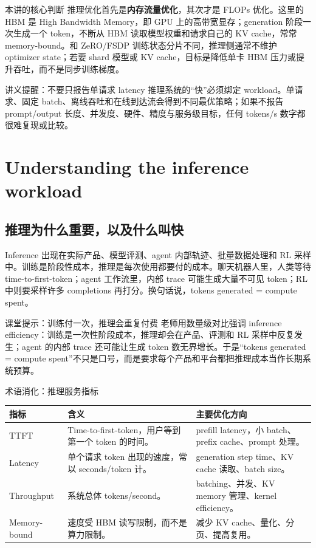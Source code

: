 \documentclass[a4paper]{article}
\begin{document}
\begin{importantbox}{本讲的核心判断}
推理优化首先是\textbf{内存流量优化}，其次才是 FLOPs 优化。这里的 HBM 是 High Bandwidth Memory，即 GPU 上的高带宽显存；generation 阶段一次生成一个 token，不断从 HBM 读取模型权重和请求自己的 KV cache，常常 memory-bound。和 ZeRO/FSDP 训练状态分片不同，推理侧通常不维护 optimizer state；若要 shard 模型或 KV cache，目标是降低单卡 HBM 压力或提升吞吐，而不是同步训练梯度。
\end{importantbox}

\begin{knowledgebox}{讲义提醒：不要只报告单请求 latency}
推理系统的“快”必须绑定 workload。单请求、固定 batch、离线吞吐和在线到达流会得到不同最优策略；如果不报告 prompt/output 长度、并发度、硬件、精度与服务级目标，任何 tokens/s 数字都很难复现或比较。
\end{knowledgebox}

\section{Understanding the inference workload}

\subsection{推理为什么重要，以及什么叫快}

Inference 出现在实际产品、模型评测、agent 内部轨迹、批量数据处理和 RL 采样中。训练是阶段性成本，推理是每次使用都要付的成本。聊天机器人里，人类等待 time-to-first-token；agent 工作流里，内部 trace 可能生成大量不可见 token；RL 中则要采样许多 completions 再打分。换句话说，tokens generated = compute spent。

\begin{knowledgebox}{课堂提示：训练付一次，推理会重复付费}
老师用数量级对比强调 inference efficiency：训练是一次性阶段成本，推理却会在产品、评测和 RL 采样中反复发生；agent 的内部 trace 还可能让生成 token 数无界增长。于是“tokens generated = compute spent”不只是口号，而是要求每个产品和平台都把推理成本当作长期系统预算。
\end{knowledgebox}

\begin{knowledgebox}{术语消化：推理服务指标}
\begin{tabular}{L{0.22\textwidth}L{0.34\textwidth}L{0.34\textwidth}}
\toprule
指标 & 含义 & 主要优化方向 \\
\midrule
TTFT & Time-to-first-token，用户等到第一个 token 的时间。 & prefill latency，小 batch、prefix cache、prompt 处理。 \\
Latency & 单个请求 token 出现的速度，常以 seconds/token 计。 & generation step time、KV cache 读取、batch size。 \\
Throughput & 系统总体 tokens/second。 & batching、并发、KV memory 管理、kernel efficiency。 \\
Memory-bound & 速度受 HBM 读写限制，而不是算力限制。 & 减少 KV cache、量化、分页、提高复用。 \\
\bottomrule
\end{tabular}
\end{knowledgebox}
\end{document}
